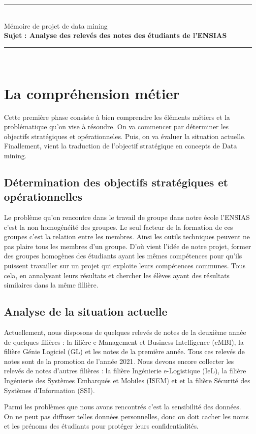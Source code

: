 \documentclass{article}
\begin{document}
    \begin{center}
        \rule{1.05\textwidth}{2pt}\\
            \Huge Mémoire de projet de data mining\\
            \huge \textbf{Sujet : Analyse des relevés des notes des étudiants de l'ENSIAS}\\
        \rule{1.05\textwidth}{2pt}\\
    \end{center}
    \newpage
        \section{La compréhension métier}
            Cette première phase consiste à bien comprendre les éléments métiers et la problématique qu’on vise à résoudre. On va commencer par déterminer les objectifs stratégiques et opérationneles. Puis, on va évaluer la situation actuelle. Finallement, vient la traduction de l’objectif stratégique en concepts de Data mining.\\
            \subsection{Détermination des objectifs stratégiques et opérationnelles}
                Le problème qu’on rencontre dans le travail de groupe dans notre école l’ENSIAS c’est la non homogénéité des groupes. Le seul facteur de la formation de ces groupes c’est la relation entre les membres. Ainsi les outils techniques peuvent ne pas plaire tous les membres d’un groupe. D’où vient l’idée de notre projet, former des groupes homogènes des étudiants ayant les mêmes compétences pour qu’ils puissent travailler sur un projet qui exploite leurs compétences communes. Tous cela, en annalysant leurs résultats et chercher les élèves ayant des résultats similaires dans la même fillière.\\
            \subsection{Analyse de la situation actuelle}
                Actuellement, nous disposons de quelques relevés de notes de la deuxième année de quelques filières : la filière e-Management et Business Intelligence (eMBI), la filière Génie Logiciel (GL) et les notes de la première année. Tous ces relevés de notes sont de la promotion de l’année 2021. Nous devons encore collecter les relevés de notes d’autres filières : la filière Ingénierie e-Logistique (IeL), la filière Ingénierie des Systèmes Embarqués et Mobiles (ISEM) et et la filière Sécurité des Systèmes d'Information (SSI).\par
                Parmi les problèmes que nous avons rencontrés c’est la sensibilité des données. On ne peut pas diffuser telles données personnelles, donc on doit cacher les noms et les prénoms des étudiants pour protéger leurs confidentialités.\\
\end{document}
